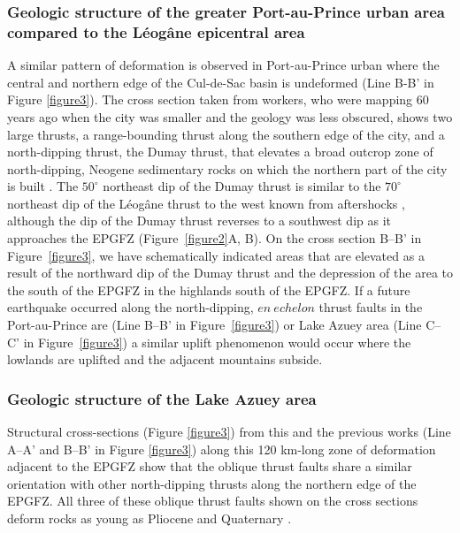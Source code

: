 \documentclass[linenumbers,draft]{agujournal}
\begin{document}
\subsubsection{Geologic structure of the greater Port-au-Prince urban area compared to the L\'eog\^ane epicentral area} 
A similar pattern of deformation is observed in Port-au-Prince urban where the central and northern edge of the Cul-de-Sac basin is undeformed \citep{massoni1955haiti,cox2011shear,mchugh2011offshore,saint2015seismotectonics} (Line B-B' in Figure \ref{figure3}). The cross section taken from workers, who were mapping 60 years ago when the city was smaller and the geology was less obscured, shows two large thrusts, a range-bounding thrust along the southern edge of the city, and a north-dipping thrust, the Dumay thrust, that elevates a broad outcrop zone of north-dipping, Neogene sedimentary rocks on which the northern part of the city is built \citep{rathje2014geotechnical}. The $50^{\circ}$ northeast dip of the Dumay thrust is similar to the $70^{\circ}$ northeast dip of the L\'eog\^ane thrust to the west known from aftershocks \citep{douilly2013crustal,douilly2015three}, although the dip of the Dumay thrust reverses to a southwest dip as it approaches the EPGFZ (Figure~\ref{figure2}A, B). On the cross section B--B' in Figure~\ref{figure3}, we have schematically indicated areas that are elevated as a result of the northward dip of the Dumay thrust and the depression of the area to the south of the EPGFZ in the highlands south of the EPGFZ. If a future earthquake occurred along the north-dipping, $en~echelon$ thrust faults in the Port-au-Prince are (Line B--B' in Figure~\ref{figure3}) or Lake Azuey area (Line C--C' in Figure~\ref{figure3}) a similar uplift phenomenon would occur where the lowlands are uplifted and the adjacent mountains subside.

\subsubsection{Geologic structure of the Lake Azuey area} 
Structural cross-sections (Figure \ref{figure3}) from this and the previous works \citep{massoni1955haiti,bourgueil1988synthese,cox2011shear,douilly2015three} (Line A--A' and B--B' in Figure \ref{figure3}) along this 120 km-long zone of deformation adjacent to the EPGFZ show that the oblique thrust faults share a similar orientation with other north-dipping thrusts along the northern edge of the EPGFZ. All three of these oblique thrust faults shown on the cross sections deform rocks as young as Pliocene and Quaternary \citep{saint2015seismotectonics}. 
\end{document}
